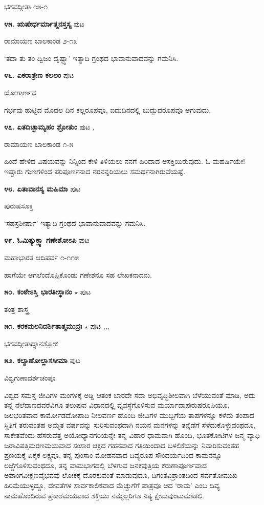 \hfill ಭಗವದ್ಗೀತಾ ೧೫-೧

\medskip
\noindent\textbf{೪೫. ಋಷೇರ್ಧರ್ಮಾತ್ಮನಸ್ತಸ್ಯ} \hfill ಪುಟ \pageref{165}

\hfill ರಾಮಾಯಣ ಬಾಲಕಾಂಡ ೨-೧೩

`ತದಾ ತು ತಂ ದ್ವಿಜಂ ದೃಷ್ಟ್ವಾ' ಇತ್ಯಾದಿ ಗ್ರಂಥದ ಭಾವಾನುವಾದವನ್ನು ಗಮನಿಸಿ.

\medskip
\noindent\textbf{೪೬. ಏಕರಾತ್ರೇಣ ಕಲಲಂ} \hfill ಪುಟ \pageref{85}

\hfill ಯೋಗಾರ್ಣವ

ಗರ್ಭವು ಹುಟ್ಟಿದ ಮೊದಲ ದಿನ ಕಲ್ಲರೂಪವೂ, ಐದುದಿನದಲ್ಲಿ ಬುದ್ಬುದರೂಪವೂ ಆಗುವುದು.

\medskip
\noindent\textbf{೪೭. ಏತದಿಚ್ಛಾಮ್ಯಹಂ ಶ್ರೋತುಂ} \hfill ಪುಟ \pageref{153},\pageref{194}

\hfill ರಾಮಾಯಣ ಬಾಲಕಾಂಡ ೧-೫

ಹಿಂದೆ ಹೇಳಿದ ವಿಷಯವನ್ನು ನಿನ್ನಿಂದ ಕೇಳಿ ತಿಳಿಯಲು ನನಗೆ ಹಿರಿದಾದ ಆಸಕ್ತಿಯಿರುವುದು. ಓ ಮಹರ್ಷಿಯೇ! ಇಷ್ಟಾರು ಗುಣಗಳಿಂದ ಪರಿಪೂರ್ಣನಾದ ನರನನ್ನರಿಯಲು ಸಮರ್ಥನಾಗಿರುವೆಯಷ್ಟೆ.

\medskip
\noindent\textbf{೪೮. ಏತಾವಾನಸ್ಯ ಮಹಿಮಾ} \hfill ಪುಟ \pageref{249}

\hfill ಪುರುಷಸೂಕ್ತ

`ಸಹಸ್ರಶೀರ್ಷಾ' ಇತ್ಯಾದಿ ಗ್ರಂಥದ ಭಾವಾನುವಾದವನ್ನು ಗಮನಿಸಿ.

\medskip
\noindent\textbf{೪೯. ಓಮಿತ್ಯುಕ್ತ್ವಾ ಗಣೇಶೋಽಪಿ} \hfill ಪುಟ \pageref{119}

\hfill ಮಹಾಭಾರತ ಆದಿಪರ್ವ ೧-೧೧೫

ಹಾಗೆಯೇ ಆಗಲೆಂದೊಪ್ಪಿಕೊಂಡು ಗಣೇಶನೂ ಸಹ ಲೇಖಕನಾದನು.

\medskip
\noindent\textbf{೫೦. ಕಂಠೇಽಸ್ತಿ ಭಾರತೀಸ್ಥಾನಂ} $\star$ \hfill ಪುಟ \pageref{31}

\hfill ತಂತ್ರ ಶಾಸ್ತ್ರ

\medskip
\noindent\textbf{೫೧. ಕರಕಮಲನಿದರ್ಶಿತಾತ್ಮಮುದ್ರಃ} $\star$ \hfill ಪುಟ \pageref{48},\pageref{92},\pageref{217},\pageref{226}

\hfill ಭಗವದ್ಗೀತಾಧ್ಯಾನಶ್ಲೋಕ

\medskip
\noindent\textbf{೫೨. ಕಲ್ಯಾಣೋಲ್ಲಾಸಸೀಮಾ} \hfill ಪುಟ \pageref{206}

\hfill ವಿಶ್ವಗುಣಾದರ್ಶಚಂಪೂ

ವಿಶ್ವದ ಸಮಸ್ತ ಜೀವಿಗಳ ಮಂಗಳಕ್ಕೆ  ಅಡ್ಡಿ ಆತಂಕ ಬಾರದೇ ಸದಾ ಅಭಿವೃದ್ಧಿಶೀಲವಾಗಿ ಬೆಳೆಯುವಂತೆ ಮಾಡಿ, ಅದು ತನ್ನ ನೆಲೆದಾಣದವರೆವಿಗೂ ತಲುಪುವ ವಿಧಾನದಲ್ಲಿ ವ್ಯವಸ್ಥೆಗೊಳಿಸುವ ಮರ್ಯಾದಾಪುರುಷರೂಪಿಯೂ, ಜಲಭರಿತವಾದ ಕಾರ್ಮೋಡದೋಪಾದಿ ನೀಲವರ್ಣ ಹೊಂದಿ ಜೀವಿಗಳ ಮುಬ್ಬಗೆಯ ತಾಪಗಳನ್ನೂ ಕಳೆದು ತಂಪಾದ ಸ್ಥಿತಿಗೆ ತರುವಂತಹ ಅಮೃತ ವರ್ಷವನ್ನು ಸುರಿಸುವಂಥದಾಗಿ ನಯನ ಮನಗಳನ್ನು ತನ್ನೆಡೆಗೆ ಸೆಳೆದುಕೊಳ್ಳುವಂಥದೂ, ಸಾಕೇತವೆಂದು ಹೆಸರುವೆತ್ತ ಅಯೋಧ್ಯಾನಗರಿಯನ್ನೇ ತನ್ನ ವಿಹಾರ ಧಾಮವಾಗಿ ಹೊಂದಿ, ಭೂತಕೋಟಿಗಳ ಜನ್ಮ ವ್ಯಾಧಿ ಜರಾವಿಪತ್ತಿಮರಣಮಯವಾದ ಸಂಸಾರ ಚಕ್ರದ ಗಹನವಾದ ಗತಿಯಿಂದಾದ ಬಳಲಿಕೆಯನ್ನು ನಿವಾರಿಸುವಂತಹ ಪ್ರಣಯಕ್ಕೆ ಏಕೈಕ ಲಕ್ಷ್ಯವೂ, ತನ್ನ ಪುಂಸಾಂ ಮೋಹನವಾದ ದಿವ್ಯರೂಪ ಸೌಂದರ್ಯದಿಂದ ಕಾಮನನ್ನೂ ಲಜ್ಜೆಗೊಳಿಸುವಂಥದೂ, ತನ್ನ ವಾಮಭಾಗದಲ್ಲಿ ಬೆಳಗುವ ಜನಕಪುತ್ರಿಯ ಕರುಣಾಪೂರ್ಣವಾದ ಅಪಾಂಗವೀಕ್ಷಣವೈಭವವು ಲೋಕಕ್ಕೆ ದೊರಕುವಂತೆ ಮಾಡುವುದೂ, ದಿಗಂತವಿಶ್ರಾಂತದಿಂದ ಸರ್ವತೋಮುಖ ಹಿರಿಮೆಯುಳ್ಳದ್ದೂ, ದೇವತೆಗಳ ಸಾರ್ವಕಾಲಿಕವಾದ ಮೆಚ್ಚುಗೆಗೆ ಪಾತ್ರವೂ ಆದ `ರಾಮ' ಎಂಬ ದಿವ್ಯ ನಾಮಹೊಂದಿರುವ ಪ್ರಕಾಶಮಯವಾದ ಶಕ್ತಿಯು ನಮ್ಮೆಲ್ಲರಿಗೂ ನಿತ್ಯ ಕ್ಷೇಮವುಂಟುಮಾಡಲಿ.

